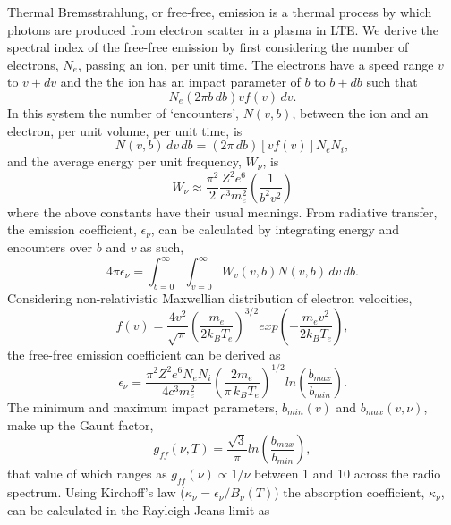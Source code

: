 Thermal Bremsstrahlung, or free-free, emission is a thermal process by which photons are produced from electron scatter in a plasma in LTE. We derive the spectral index of the free-free emission by first considering the number of electrons, $N_{e}$, passing an ion, per unit time. The electrons have a speed range $v$ to $v + dv$ and the the ion has an impact parameter of $b$ to $b + db$ such that 
\begin{equation}
N_{e}(2\pi b\,db)vf(v)\,dv. \label{eqn:ion}
\end{equation}
In this system the number of `encounters', $N(v,b)$, between the ion and an electron, per unit volume, per unit time, is 
\begin{equation}
N(v,b)\,dv\,db = (2\pi\,db)[vf(v)]N_{e}N_{i}, \label{eqn:encounters}
\end{equation}
and the average energy per unit frequency, $W_{\nu}$, is 
\begin{equation}
W_{\nu}\approx \frac{\pi^{2}}{2}\frac{Z^{2}e^{6}}{c^{3}m_{e}^2}\left ( \frac{1}{b^{2}v^{2}} \right ) 
\label{eqn:energy}
\end{equation}
where the above constants have their usual meanings. From radiative transfer, the emission coefficient, $\epsilon _{\nu}$, can be calculated by integrating energy and encounters over $b$ and $v$ as such, 
\begin{equation}
4\pi\epsilon _{\nu}=\int_{b=0}^{\infty }\int_{v=0}^{\infty }W_{v}(v,b)N(v,b)\,dv\,db. \label{eqn:epsilon} 
\end{equation}
Considering non-relativistic Maxwellian distribution of electron velocities,  
\begin{equation}
f(v)=\frac{4v^{2}}{\sqrt{\pi }}\left ( \frac{m_{e}}{2k_{B}T_{e}} \right )^{3/2}exp\left (- \frac{m_{e}v^{2}}{2k_{B}T_{e}} \right ), \label{eqn:max}
\end{equation}
the free-free emission coefficient can be derived as 
\begin{equation}
\epsilon _{\nu}=\frac{\pi^{2}Z^{2}e^{6}N_{e}N_{i}}{4c^{3}m_{e}^{2}}\left ( \frac{2m_{e}}{\pi\,k_{B}T_{e}} \right )^{1/2}ln\left ( \frac{b_{max}}{b_{min}} \right ).
\label{eqn:eff}
\end{equation}
The minimum and maximum impact parameters, $b_{min}(v)$ and $b_{max}(v,\nu)$, make up the Gaunt factor, 
\begin{equation}
g_{ff}(\nu,T) = \frac{\sqrt{3}}{\pi}ln\left (\frac{b_{max}}{b_{min}} \right), 
\label{eqn:gaunt}
\end{equation}
that value of which ranges as $g_{ff}(\nu)\propto 1/\nu$ between 1 and 10 across the radio spectrum. Using Kirchoff's law ($\kappa_\nu=\epsilon_{\nu} / B_{\nu}(T)$) the absorption coefficient, $\kappa_\nu$, can be calculated in the Rayleigh-Jeans limit as 
